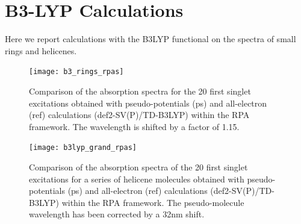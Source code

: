 \documentclass[aip]{revtex4-1}
\begin{document}
\clearpage
\section*{B3-LYP Calculations}

Here we report calculations with the B3LYP functional on the spectra of small rings and helicenes.

\begin{figure}[b]
\begin{center}
\texttt{[image: b3\_rings\_rpas]}
\end{center}
\hspace*{3in}
\caption{Comparison of the absorption spectra for the 20 first singlet excitations obtained with
pseudo-potentials (ps) and all-electron (ref) calculations (def2-SV(P)/TD-B3LYP) within the RPA
framework. The wavelength is shifted by a factor of 1.15.}
\label{fig:cnhn_uv_rpas_b3lyp}
\end{figure}

\begin{figure}
\begin{center}
\texttt{[image: b3lyp\_grand\_rpas]}
\end{center}
\vspace{0.25in}
\hspace*{3in}
\caption{Comparison of the absorption spectra of the 20 first singlet excitations for a series of helicene molecules obtained with pseudo-potentials (ps) and all-electron (ref) calculations (def2-SV(P)/TD-B3LYP) within the RPA
framework. The pseudo-molecule wavelength has been corrected by a 32nm shift.}
\label{fig:helicene_spectra_b3lyp}
\end{figure}

\clearpage


\end{document}
